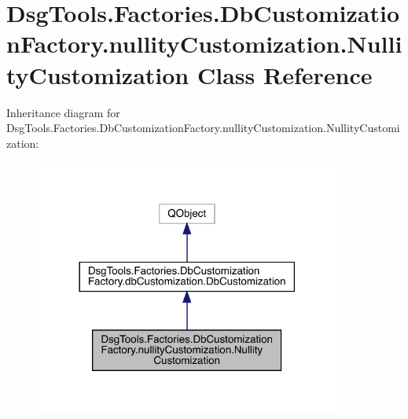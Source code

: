 \hypertarget{class_dsg_tools_1_1_factories_1_1_db_customization_factory_1_1nullity_customization_1_1_nullity_customization}{}\section{Dsg\+Tools.\+Factories.\+Db\+Customization\+Factory.\+nullity\+Customization.\+Nullity\+Customization Class Reference}
\label{class_dsg_tools_1_1_factories_1_1_db_customization_factory_1_1nullity_customization_1_1_nullity_customization}


Inheritance diagram for Dsg\+Tools.\+Factories.\+Db\+Customization\+Factory.\+nullity\+Customization.\+Nullity\+Customization\+:
\nopagebreak
\begin{figure}[H]
\begin{center}
\leavevmode
\includegraphics[width=285pt]{class_dsg_tools_1_1_factories_1_1_db_customization_factory_1_1nullity_customization_1_1_nullity_customization__inherit__graph}
\end{center}
\end{figure}



